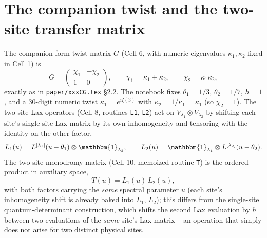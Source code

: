 \documentclass[11pt]{article}
\begin{document}
\section{The companion twist and the two-site transfer matrix}
\label{sec:twosite}

The companion-form twist matrix $G$ (Cell 6, with numeric eigenvalues $\kappa_1,\kappa_2$ fixed in
Cell 1) is
\begin{equation}
  G = \begin{pmatrix} \chi_1 & -\chi_2 \\ 1 & 0 \end{pmatrix}, \qquad
  \chi_1=\kappa_1+\kappa_2, \qquad \chi_2=\kappa_1\kappa_2,
  \label{eq:G}
\end{equation}
exactly as in \texttt{paper/xxxCG.tex} \S2.2. The notebook fixes $\theta_1=1/3$, $\theta_2=1/7$,
$h=1$, and a 30-digit numeric twist $\kappa_1=e^{i\zeta(3)}$ with $\kappa_2=1/\kappa_1=\overline{\kappa_1}$
(so $\chi_2=1$). The two-site Lax operators (Cell 8, routines \texttt{L1}, \texttt{L2}) act on
$V_{\lambda_1}\otimes V_{\lambda_2}$ by shifting each site's single-site Lax matrix by its own
inhomogeneity and tensoring with the identity on the other factor,
\[
  L_1(u) = L^{[\lambda_1]}(u-\theta_1)\otimes \mathbbm{1}_{\lambda_2}, \qquad
  L_2(u) = \mathbbm{1}_{\lambda_1}\otimes L^{[\lambda_2]}(u-\theta_2).
\]
The two-site monodromy matrix (Cell 10, memoized routine \texttt{T}) is the ordered product in
auxiliary space,
\begin{equation}
  T(u) = L_1(u)\, L_2(u),
  \label{eq:monodromy}
\end{equation}
with both factors carrying the \emph{same} spectral parameter $u$ (each site's inhomogeneity shift
is already baked into $L_1$, $L_2$); this differs from the single-site quantum-determinant
construction, which shifts the second Lax evaluation by $h$ between two evaluations of the
\emph{same} site's Lax matrix -- an operation that simply does not arise for two distinct physical
sites.
\end{document}
